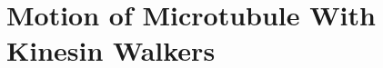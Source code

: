 \documentclass[11pt]{ucthesis}
\def\bu{{\bf u}}
\begin{document}



\section{Motion of Microtubule With Kinesin Walkers}
\end{document}
